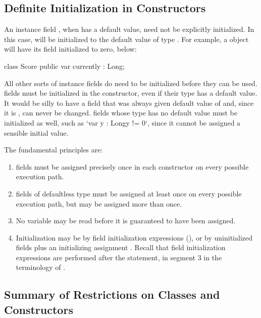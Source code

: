 \subsection{Definite Initialization in Constructors}


An instance field , when  has a default value, need not be
explicitly initialized.  In this case,  will be initialized to the
default value of type .  For example, a  object will have
its  field initialized to zero, below:
\begin{xten}
class Score {
  public var currently : Long;
}
\end{xten}
%

All other sorts of instance fields do need to be initialized before they can
be used.   fields must be initialized in the constructor, even if
their type has a 
default value.  It would be silly to have a field  that was
always given default value of  and, since it is , can never be
changed.   fields whose type has no default value must be initialized
as well, such as \xcd`var y : Long{y != 0}`, since it cannot be assigned a
sensible initial value.

The fundamental principles are:
\begin{enumerate}
\item {} fields must be assigned precisely once in each constructor on every
possible execution path.
\item {} fields of defaultless type must be
assigned at least once on every possible execution path, but may be assigned
more than once.
\item No variable may be read before it is guaranteed to have been
assigned.
\item Initialization may be by field initialization expressions (), or by uninitialized fields  plus
an initializing assignment .  Recall that field initialization
expressions are performed after the  statement, in segment 3 in
the terminology of .
\end{enumerate}



\subsection{Summary of Restrictions on Classes and Constructors}

